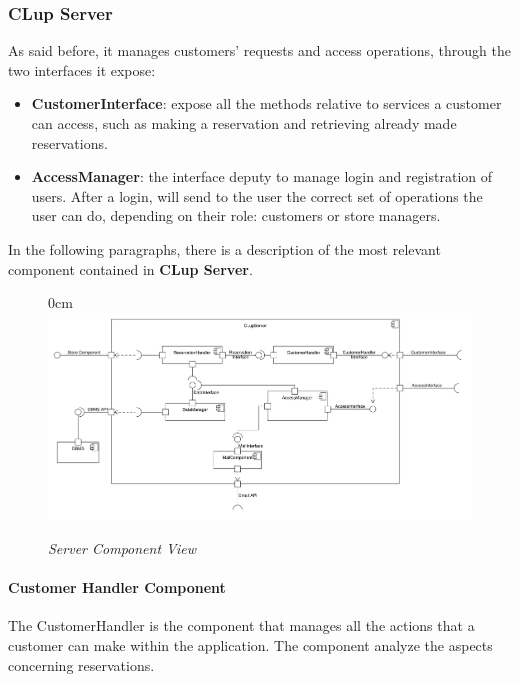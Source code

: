 \documentclass{article}
\begin{document}
			\subsubsection{CLup Server}
			As said before, it manages customers’ requests and access operations, through the two interfaces it expose:
			
			\begin{itemize}
				\item {\bfseries CustomerInterface}: expose all the methods relative to services a customer can access, such as making a reservation and retrieving already made reservations.
				
				\item {\bfseries AccessManager}: the interface deputy to manage login and registration of users. After a login, will send to the user the correct set of operations the user can do, depending on their role: customers or store managers.
			\end{itemize}
			
			In the following paragraphs, there is a description of the most relevant component contained in {\bfseries CLup Server}.
			\begin{figure}
				\begin{adjustwidth} {0cm}{}
					\centering
					\includegraphics[scale=0.37, angle=90, trim= 0 0 0 -5cm]{Component Diagrams/ServerComponentView.pdf}\\
				\end{adjustwidth}
				\caption{\emph{Server Component View}}
			\end{figure}
			\newpage
				\paragraph{Customer Handler Component}
					The CustomerHandler is the component that manages all the actions that a customer can make within the application. The component analyze the aspects concerning reservations.
					
\end{document}
